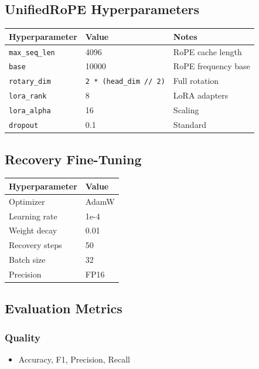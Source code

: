 \subsection{UnifiedRoPE Hyperparameters}

\begin{table}[H]
\centering
\small
\begin{tabular}{lll}
\toprule
\textbf{Hyperparameter} & \textbf{Value} & \textbf{Notes} \\
\midrule
\texttt{max\_seq\_len} & 4096 & RoPE cache length \\
\texttt{base} & 10000 & RoPE frequency base \\
\texttt{rotary\_dim} & \texttt{2 * (head\_dim // 2)} & Full rotation \\
\texttt{lora\_rank} & 8 & LoRA adapters \\
\texttt{lora\_alpha} & 16 & Scaling \\
\texttt{dropout} & 0.1 & Standard \\
\bottomrule
\end{tabular}
\end{table}

\subsection{Recovery Fine-Tuning}

\begin{table}[H]
\centering
\small
\begin{tabular}{ll}
\toprule
\textbf{Hyperparameter} & \textbf{Value} \\
\midrule
Optimizer & AdamW \\
Learning rate & 1e-4 \\
Weight decay & 0.01 \\
Recovery steps & 50 \\
Batch size & 32 \\
Precision & FP16 \\
\bottomrule
\end{tabular}
\end{table}

\subsection{Evaluation Metrics}

\subsubsection{Quality}
\begin{itemize}
\item Accuracy, F1, Precision, Recall

\end{itemize}
